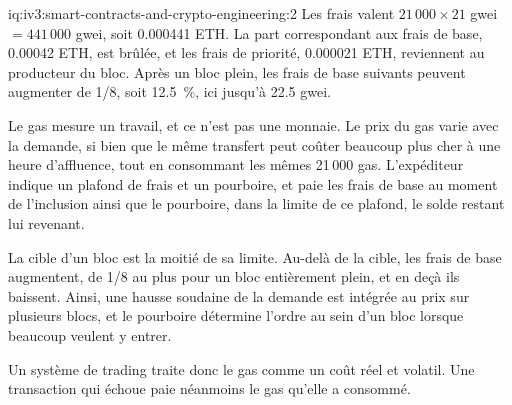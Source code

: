 \begin{solution}{iq:iv3:smart-contracts-and-crypto-engineering:2}
Les frais valent $21\,000 \times 21$ gwei $= 441\,000$ gwei, soit 0.000441 ETH. La part correspondant aux frais de base, 0.00042 ETH, est brûlée, et les frais de priorité, 0.000021 ETH, reviennent au producteur du bloc. Après un bloc plein, les frais de base suivants peuvent augmenter de 1/8, soit 12.5~\%, ici jusqu'à 22.5 gwei.

Le gas mesure un travail, et ce n'est pas une monnaie. Le prix du gas varie avec la demande, si bien que le même transfert peut coûter beaucoup plus cher à une heure d'affluence, tout en consommant les mêmes 21\,000 gas. L'expéditeur indique un plafond de frais et un pourboire, et paie les frais de base au moment de l'inclusion ainsi que le pourboire, dans la limite de ce plafond, le solde restant lui revenant.

La cible d'un bloc est la moitié de sa limite. Au-delà de la cible, les frais de base augmentent, de 1/8 au plus pour un bloc entièrement plein, et en deçà ils baissent. Ainsi, une hausse soudaine de la demande est intégrée au prix sur plusieurs blocs, et le pourboire détermine l'ordre au sein d'un bloc lorsque beaucoup veulent y entrer.

Un système de trading traite donc le gas comme un coût réel et volatil. Une transaction qui échoue paie néanmoins le gas qu'elle a consommé.

\end{solution}

